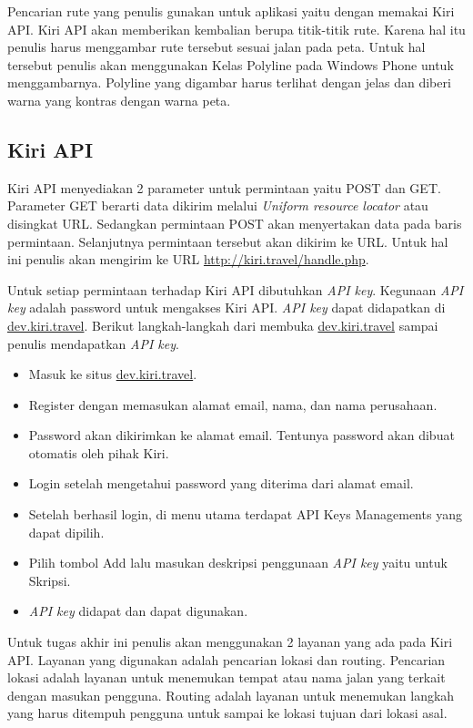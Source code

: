 \hspace{0.5cm} Pencarian rute yang penulis gunakan untuk aplikasi yaitu dengan memakai Kiri API. Kiri API akan memberikan kembalian berupa titik-titik rute. Karena hal itu penulis harus menggambar rute tersebut sesuai jalan pada peta. Untuk hal tersebut penulis akan menggunakan Kelas Polyline pada Windows Phone untuk menggambarnya. Polyline yang digambar harus terlihat dengan jelas dan diberi warna yang kontras dengan warna peta.

\subsection{Kiri API}
\label{lab:Kiri API}
\hspace{0.5cm} Kiri API menyediakan 2 parameter untuk permintaan yaitu POST dan GET. Parameter GET berarti data dikirim melalui \textit{Uniform resource locator} atau disingkat URL. Sedangkan permintaan POST akan menyertakan data pada baris permintaan. Selanjutnya permintaan tersebut akan dikirim ke URL. Untuk hal ini penulis akan mengirim ke URL \url{ http://kiri.travel/handle.php}.

\hspace{0.5cm} Untuk setiap permintaan terhadap Kiri API dibutuhkan \textit{API key}. Kegunaan \textit{API key} adalah password untuk mengakses Kiri API. \textit{API key} dapat didapatkan di \url{dev.kiri.travel}. Berikut langkah-langkah dari membuka \url{dev.kiri.travel} sampai penulis mendapatkan \textit{API key}.
\begin{itemize}
	\item Masuk ke situs \url{dev.kiri.travel}.
	\item Register dengan memasukan alamat email, nama, dan nama perusahaan.
	\item Password akan dikirimkan ke alamat email. Tentunya password akan dibuat otomatis oleh pihak Kiri.
	\item Login setelah mengetahui password yang diterima dari alamat email. 
	\item Setelah berhasil login, di menu utama terdapat API Keys Managements yang dapat dipilih.
	\item Pilih tombol Add lalu masukan deskripsi penggunaan \textit{API key} yaitu untuk Skripsi.
	\item \textit{API key} didapat dan dapat digunakan.
\end{itemize}
     
\hspace{0.5cm} Untuk tugas akhir ini penulis akan menggunakan 2 layanan yang ada pada Kiri API. Layanan yang digunakan adalah pencarian lokasi dan routing. Pencarian lokasi adalah layanan untuk menemukan tempat atau nama jalan yang terkait dengan masukan pengguna. Routing adalah layanan untuk menemukan langkah yang harus ditempuh pengguna untuk sampai ke lokasi tujuan dari lokasi asal. 

